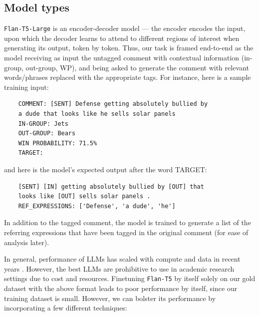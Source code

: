 \subsection{Model types}

\texttt{Flan-T5-Large} is an encoder-decoder model --- the encoder encodes the input, upon which the decoder learns to attend to different regions of interest when generating its output, token by token. Thus, our task is framed end-to-end as the model receiving as input the untagged comment with contextual information (in-group, out-group, WP), and being asked to generate the comment with relevant words/phrases replaced with the appropriate tags. For instance, here is a sample training input:

\begin{verbatim}
    COMMENT: [SENT] Defense getting absolutely bullied by 
    a dude that looks like he sells solar panels
    IN-GROUP: Jets
    OUT-GROUP: Bears
    WIN PROBABILITY: 71.5%
    TARGET:
\end{verbatim}

and here is the model's expected output after the word TARGET:

\begin{verbatim}
    [SENT] [IN] getting absolutely bullied by [OUT] that
    looks like [OUT] sells solar panels .
    REF_EXPRESSIONS: ['Defense', 'a dude', 'he']
\end{verbatim}

In addition to the tagged comment, the model is trained to generate a list of the referring expressions that have been tagged in the original comment (for ease of analysis later).

In general, performance of LLMs has scaled with compute and data in recent years \citep{kaplan2020scaling}. However, the best LLMs are prohibitive to use in academic research settings due to cost and resources. Finetuning \texttt{Flan-T5} by itself solely on our gold dataset with the above format leads to poor performance by itself, since our training dataset is small. However, we can bolster its performance by incorporating a few different techniques: 

